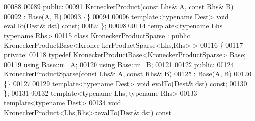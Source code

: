 \begin{DoxyCode}
00088 
00089   \textcolor{keyword}{public}:
\hyperlink{class_eigen_1_1_kronecker_product_a0b01b6d5ae2413cef8fd91fe7a98a0d7}{00091}     \hyperlink{class_eigen_1_1_kronecker_product_a0b01b6d5ae2413cef8fd91fe7a98a0d7}{KroneckerProduct}(\textcolor{keyword}{const} Lhs& \hyperlink{group___core___module_class_eigen_1_1_matrix}{A}, \textcolor{keyword}{const} Rhs& \hyperlink{group___core___module_class_eigen_1_1_matrix}{B})
00092       : Base(A, B)
00093     \{\}
00094 
00096     \textcolor{keyword}{template}<\textcolor{keyword}{typename} Dest> \textcolor{keywordtype}{void} evalTo(Dest& dst) \textcolor{keyword}{const};
00097 \};
00098 
00114 \textcolor{keyword}{template}<\textcolor{keyword}{typename} Lhs, \textcolor{keyword}{typename} Rhs>
00115 \textcolor{keyword}{class }\hyperlink{class_eigen_1_1_kronecker_product_sparse}{KroneckerProductSparse} : \textcolor{keyword}{public} \hyperlink{class_eigen_1_1_kronecker_product_base}{KroneckerProductBase}<Kronec
      kerProductSparse<Lhs,Rhs> >
00116 \{
00117   \textcolor{keyword}{private}:
00118     \textcolor{keyword}{typedef} \hyperlink{class_eigen_1_1_kronecker_product_base}{KroneckerProductBase<KroneckerProductSparse>} 
      \hyperlink{class_eigen_1_1_kronecker_product_base}{Base};
00119     \textcolor{keyword}{using} Base::m\_A;
00120     \textcolor{keyword}{using} Base::m\_B;
00121 
00122   \textcolor{keyword}{public}:
\hyperlink{class_eigen_1_1_kronecker_product_sparse_ac0a69ba844415fbe79e6514f32b41fb5}{00124}     \hyperlink{class_eigen_1_1_kronecker_product_sparse_ac0a69ba844415fbe79e6514f32b41fb5}{KroneckerProductSparse}(\textcolor{keyword}{const} Lhs& \hyperlink{group___core___module_class_eigen_1_1_matrix}{A}, \textcolor{keyword}{const} Rhs& \hyperlink{group___core___module_class_eigen_1_1_matrix}{B})
00125       : Base(A, B)
00126     \{\}
00127 
00129     \textcolor{keyword}{template}<\textcolor{keyword}{typename} Dest> \textcolor{keywordtype}{void} evalTo(Dest& dst) \textcolor{keyword}{const};
00130 \};
00131 
00132 \textcolor{keyword}{template}<\textcolor{keyword}{typename} Lhs, \textcolor{keyword}{typename} Rhs>
00133 \textcolor{keyword}{template}<\textcolor{keyword}{typename} Dest>
00134 \textcolor{keywordtype}{void} \hyperlink{class_eigen_1_1_kronecker_product_a10f65aca36ed69da354e70b300b5a223}{KroneckerProduct<Lhs,Rhs>::evalTo}(Dest& dst)\textcolor{keyword}{ const}

\end{DoxyCode}
